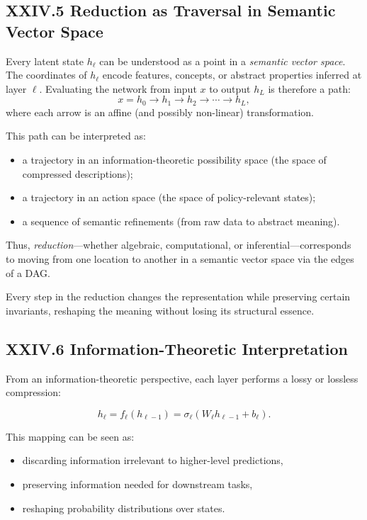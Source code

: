 \documentclass[12pt,letterpaper]{article}
\begin{document}
\subsection{XXIV.5 Reduction as Traversal in Semantic Vector Space}

Every latent state $h_\ell$ can be understood as a point in a \emph{semantic vector space}. The coordinates of $h_\ell$ encode features, concepts, or abstract properties inferred at layer $\ell$. Evaluating the network from input $x$ to output $h_L$ is therefore a path:
\[
x = h_0 \to h_1 \to h_2 \to \cdots \to h_L,
\]
where each arrow is an affine (and possibly non-linear) transformation.

This path can be interpreted as:

\begin{itemize}
    \item a trajectory in an information-theoretic possibility space (the space of compressed descriptions);
    \item a trajectory in an action space (the space of policy-relevant states);
    \item a sequence of semantic refinements (from raw data to abstract meaning).
\end{itemize}

Thus, \emph{reduction}—whether algebraic, computational, or inferential—corresponds to moving from one location to another in a semantic vector space via the edges of a DAG.

Every step in the reduction changes the representation while preserving certain invariants, reshaping the meaning without losing its structural essence.

\subsection{XXIV.6 Information-Theoretic Interpretation}

From an information-theoretic perspective, each layer performs a lossy or lossless compression:

\[
h_\ell = f_\ell(h_{\ell-1}) = \sigma_\ell(W_\ell h_{\ell-1} + b_\ell).
\]

This mapping can be seen as:

\begin{itemize}
    \item discarding information irrelevant to higher-level predictions,
    \item preserving information needed for downstream tasks,
    \item reshaping probability distributions over states.
\end{itemize}
\end{document}
